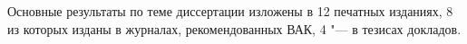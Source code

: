      Основные результаты по теме диссертации изложены в 12 печатных изданиях, 
    8 из которых изданы в журналах, рекомендованных ВАК, 
    4 "--- в тезисах докладов.%
    

